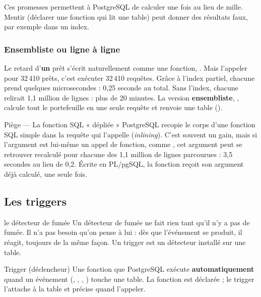 Ces promesses permettent à PostgreSQL de calculer une fois au lieu de mille. Mentir (déclarer
 une fonction qui lit une table) peut donner des résultats faux, par exemple dans un
index.

\subsubsection{Ensembliste ou ligne à ligne}

Le retard d'\textbf{un} prêt s'écrit naturellement comme une fonction, .
Mais l'appeler pour 32\,410 prêts, c'est exécuter 32\,410 requêtes. Grâce à l'index partiel, chacune
prend quelques microsecondes : 0,25 seconde au total. Sans l'index, chacune relirait 1,1 million de
lignes : plus de 20 minutes. La version \textbf{ensembliste}, , calcule
tout le portefeuille en une seule requête et renvoie une table ().

\begin{piege}{Piège --- La fonction SQL « dépliée »}
PostgreSQL recopie le corps d'une fonction SQL simple dans la requête qui l'appelle (\emph{inlining}).
C'est souvent un gain, mais si l'argument est lui-même un appel de fonction, comme
, cet argument peut se retrouver recalculé pour chacune
des 1,1 million de lignes parcourues : 3,5 secondes au lieu de 0,2. Écrite en PL/pgSQL, la fonction
reçoit son argument déjà calculé, une seule fois.
\end{piege}

\subsection{Les triggers}

\begin{analogie}{le détecteur de fumée}
Un détecteur de fumée ne fait rien tant qu'il n'y a pas de fumée. Il n'a pas besoin qu'on pense à lui :
dès que l'événement se produit, il réagit, toujours de la même façon. Un trigger est un détecteur
installé sur une table.
\end{analogie}

\begin{definition}{Trigger (déclencheur)}
Une fonction que PostgreSQL exécute \textbf{automatiquement} quand un événement (,
, , ) touche une table. La fonction est déclarée
 ; le trigger l'attache à la table et précise quand l'appeler.
\end{definition}

